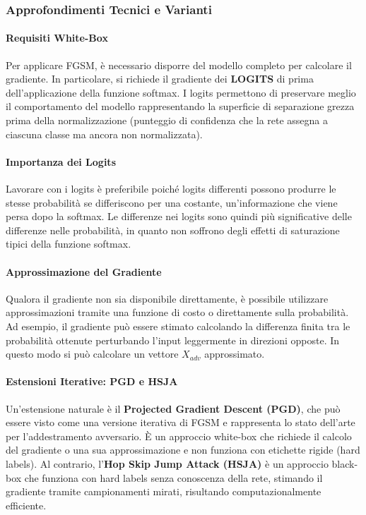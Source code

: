 \subsubsection{Approfondimenti Tecnici e Varianti}

\paragraph{Requisiti White-Box}

Per applicare FGSM, è necessario disporre del modello completo
per calcolare il gradiente. In particolare, si richiede il
gradiente dei \textbf{LOGITS} di prima dell'applicazione della
funzione softmax. I logits permettono di preservare meglio il
comportamento del modello rappresentando la superficie di
separazione grezza prima della normalizzazione (punteggio di
confidenza che la rete assegna a ciascuna classe ma ancora
non normalizzata).

\paragraph{Importanza dei Logits}

Lavorare con i logits è preferibile poiché logits differenti
possono produrre le stesse probabilità se differiscono per una
costante, un'informazione che viene persa dopo la softmax.
Le differenze nei logits sono quindi più significative delle
differenze nelle probabilità, in quanto non soffrono degli
effetti di saturazione tipici della funzione softmax.

\paragraph{Approssimazione del Gradiente}

Qualora il gradiente non sia disponibile direttamente, è
possibile utilizzare approssimazioni tramite una funzione di
costo o direttamente sulla probabilità. Ad esempio, il gradiente
può essere stimato calcolando la differenza finita tra le
probabilità ottenute perturbando l'input leggermente in direzioni
opposte. In questo modo si può calcolare un vettore $X_{adv}$
approssimato.

\paragraph{Estensioni Iterative: PGD e HSJA}

Un'estensione naturale è il \textbf{Projected Gradient Descent
(PGD)}, che può essere visto come una versione iterativa di
FGSM e rappresenta lo stato dell'arte per l'addestramento
avversario. È un approccio white-box che richiede il calcolo del
gradiente o una sua approssimazione e non funziona con etichette
rigide (hard labels). Al contrario, l'\textbf{Hop Skip Jump
Attack (HSJA)} è un approccio black-box che funziona con hard
labels senza conoscenza della rete, stimando il gradiente tramite
campionamenti mirati, risultando computazionalmente efficiente.

